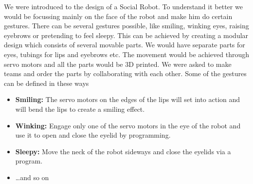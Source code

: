 \documentclass[index=totoc,hyperref,openany]{labbook} %
\begin{document}
We were introduced to the design of a Social Robot. To understand it better we would be focussing mainly on the face of the robot and make him do certain gestures. There can be several gestures possible, like smiling, winking eyes, raising eyebrows or pretending to feel sleepy. This can be achieved by creating a modular design which consists of several movable parts. We would have separate parts for eyes, tubings for lips and eyebrows etc. The movement would be achieved through servo motors and all the parts would be 3D printed. We were asked to make teams and order the parts by collaborating with each other.
Some of the gestures can be defined in these ways
\begin{itemize}
\item \textbf{Smiling:} The servo motors on the edges of the lips will set into action and will bend the lips to create a smiling effect.
\item \textbf{Winking:} Engage only one of the servo motors in the eye of the robot and use it to open and close the eyelid by programming.
\item \textbf{Sleepy:} Move the neck of the robot sideways and close the eyelids via a program.
\item \ldots and so on
\end{itemize}
\end{document}
